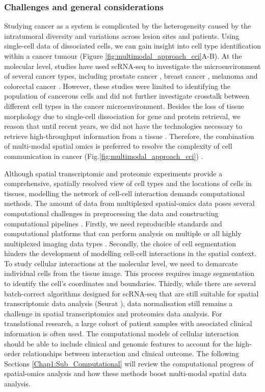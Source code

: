\subsubsection{Challenges and general considerations}
Studying cancer as a system is complicated by the heterogeneity caused by the intratumoral diversity and variations across lesion sites and patients. Using single-cell data of dissociated cells, we can gain insight into cell type identification within a cancer tumour (Figure \ref{fig:multimodal_approach_cci}A-B). At the molecular level, studies have used scRNA-seq to investigate the microenvironment of several cancer types, including prostate cancer \cite{miyamoto2015rna}, breast cancer \cite{brady2017combating}, melanoma \cite{tirosh2016dissecting} and colorectal cancer \cite{li2017reference}. However, these studies were limited to identifying the population of cancerous cells and did not further investigate crosstalk between different cell types in the cancer microenvironment. Besides the loss of tissue morphology due to single-cell dissociation for gene and protein retrieval, we reason that until recent years, we did not have the technologies necessary to retrieve high-throughput information from a tissue \cite{bodenmiller2016multiplexed}. Therefore, the combination of multi-modal spatial omics is preferred to resolve the complexity of cell communication in cancer (Fig.\ref{fig:multimodal_approach_cci}) \cite{de2020unraveling}.   

Although spatial transcriptomic and proteomic experiments provide a comprehensive, spatially resolved view of cell types and the locations of cells in tissues, modelling the network of cell-cell interaction demands computational methods. The amount of data from multiplexed spatial-omics data poses several computational challenges in preprocessing the data and constructing computational pipelines \cite{wu2022spatial}. Firstly, we need reproducible standards and computational platforms that can perform analysis on multiple or all highly multiplexed imaging data types \cite{bodenmiller2016multiplexed, schuffler2015automatic}. Secondly, the choice of cell segmentation hinders the development of modelling cell-cell interactions in the spatial context. To study cellular interactions at the molecular level, we need to demarcate individual cells from the tissue image. This process requires image segmentation to identify the cell's coordinates and boundaries. Thirdly, while there are several batch-correct algorithms designed for scRNA-seq that are still suitable for spatial transcriptomic data analysis (\ie Seurat \cite{butler2018integrating}), data normalisation still remains a challenge in spatial transcriptomics and proteomics data analysis. For translational research, a large cohort of patient samples with associated clinical information is often used. The computational models of cellular interaction should be able to include clinical and genomic features to account for the high-order relationships between interaction and clinical outcome. The following Sections \ref{Chap1:Sub_Computational} will review the computational progress of spatial-omics analysis and how these methods boost multi-modal spatial data analysis.  


